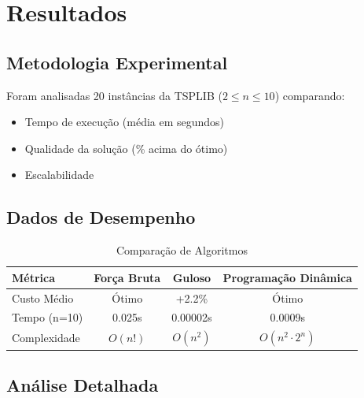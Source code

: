 \section{Resultados}

\subsection{Metodologia Experimental}
Foram analisadas 20 instâncias da TSPLIB ($2 \leq n \leq 10$) comparando:

\begin{itemize}
\item Tempo de execução (média em segundos)
\item Qualidade da solução (\% acima do ótimo)
\item Escalabilidade
\end{itemize}

\subsection{Dados de Desempenho}

\begin{table}[h]
\centering
\caption{Comparação de Algoritmos}
\begin{tabular}{|l|c|c|c|}
\hline
\textbf{Métrica} & \textbf{Força Bruta} & \textbf{Guloso} & \textbf{Programação Dinâmica} \\
\hline
Custo Médio & Ótimo & +2.2\% & Ótimo \\
Tempo (n=10) & 0.025s & 0.00002s & 0.0009s \\
Complexidade & $O(n!)$ & $O(n^2)$ & $O(n^2 \cdot 2^n)$ \\
\hline
\end{tabular}
\end{table}

\subsection{Análise Detalhada}

